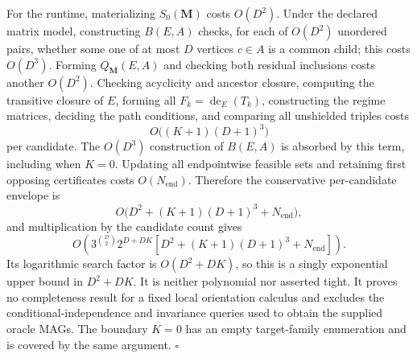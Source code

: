 For the runtime, materializing \(S_0(\mathbf M)\) costs \(O(D^2)\).  Under the declared matrix model, constructing \(B(E,A)\) checks, for each of \(O(D^2)\) unordered pairs, whether some one of at most \(D\) vertices \(c\in A\) is a common child; this costs \(O(D^3)\).  Forming \(Q_{\mathbf M}(E,A)\) and checking both residual inclusions costs another \(O(D^2)\).  Checking acyclicity and ancestor closure, computing the transitive closure of \(E\), forming all \(F_k=\operatorname{de}_E(T_k)\), constructing the regime matrices, deciding the path conditions, and comparing all unshielded triples costs
\[
O\bigl((K+1)(D+1)^3\bigr)
\]
per candidate.  The \(O(D^3)\) construction of \(B(E,A)\) is absorbed by this term, including when \(K=0\).  Updating all endpointwise feasible sets and retaining first opposing certificates costs \(O(N_{\mathrm{end}})\).  Therefore the conservative per-candidate envelope is
\[
O\bigl(D^2+(K+1)(D+1)^3+N_{\mathrm{end}}\bigr),
\]
and multiplication by the candidate count gives
\[
O\!\left(
3^{\binom D2}2^{D+DK}
\left[D^2+(K+1)(D+1)^3+N_{\mathrm{end}}\right]
\right).
\]
Its logarithmic search factor is \(O(D^2+DK)\), so this is a singly exponential upper bound in \(D^2+DK\).  It is neither polynomial nor asserted tight.  It proves no completeness result for a fixed local orientation calculus and excludes the conditional-independence and invariance queries used to obtain the supplied oracle MAGs.  The boundary \(K=0\) has an empty target-family enumeration and is covered by the same argument. \(\square\)